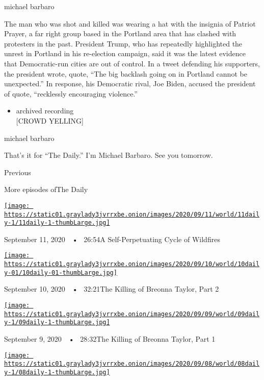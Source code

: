 michael barbaro

The man who was shot and killed was wearing a hat with the insignia of
Patriot Prayer, a far right group based in the Portland area that has
clashed with protesters in the past. President Trump, who has repeatedly
highlighted the unrest in Portland in his re-election campaign, said it
was the latest evidence that Democratic-run cities are out of control.
In a tweet defending his supporters, the president wrote, quote, ``The
big backlash going on in Portland cannot be unexpected.'' In response,
his Democratic rival, Joe Biden, accused the president of quote,
``recklessly encouraging violence.''

\begin{itemize}
\tightlist
\item
  archived recording\\
  {[}CROWD YELLING{]}
\end{itemize}

michael barbaro

That's it for ``The Daily.'' I'm Michael Barbaro. See you tomorrow.

Previous

More episodes ofThe Daily

\href{https://www.nytimes3xbfgragh.onion/2020/09/11/podcasts/the-daily/wildfires-california-fire-zones.html?action=click\&module=audio-series-bar\&region=header\&pgtype=Article}{\texttt{[image: https://static01.graylady3jvrrxbe.onion/images/2020/09/11/world/11daily-1/11daily-1-thumbLarge.jpg]}}

September 11, 2020~~•~ 26:54A Self-Perpetuating Cycle of Wildfires

\href{https://www.nytimes3xbfgragh.onion/2020/09/10/podcasts/the-daily/Breonna-Taylor.html?action=click\&module=audio-series-bar\&region=header\&pgtype=Article}{\texttt{[image: https://static01.graylady3jvrrxbe.onion/images/2020/09/10/world/10daily-01/10daily-01-thumbLarge.jpg]}}

September 10, 2020~~•~ 32:21The Killing of Breonna Taylor, Part 2

\href{https://www.nytimes3xbfgragh.onion/2020/09/09/podcasts/the-daily/breonna-taylor.html?action=click\&module=audio-series-bar\&region=header\&pgtype=Article}{\texttt{[image: https://static01.graylady3jvrrxbe.onion/images/2020/09/09/world/09daily-1/09daily-1-thumbLarge.jpg]}}

September 9, 2020~~•~ 28:32The Killing of Breonna Taylor, Part 1

\href{https://www.nytimes3xbfgragh.onion/2020/09/08/podcasts/the-daily/Daniel-Prude-BLM-police.html?action=click\&module=audio-series-bar\&region=header\&pgtype=Article}{\texttt{[image: https://static01.graylady3jvrrxbe.onion/images/2020/09/08/world/08daily-1/08daily-1-thumbLarge.jpg]}}

